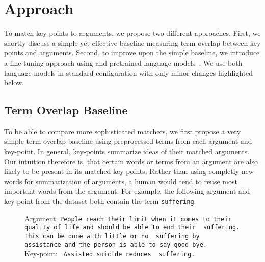 \section{Approach}\label{approach}

To match key points to arguments, we propose two different approaches.
First, we shortly discuss a simple yet effective baseline measuring term overlap between key points and arguments.
Second, to improve upon the simple baseline, we introduce a fine-tuning approach using \Bert and \Roberta pretrained language models~\cite{DevlinCLT2019,LiuOGDJCLLZS2019}. We use both language models in standard configuration with only minor changes highlighted below.

\subsection{Term Overlap Baseline}
To be able to compare more sophisticated matchers, we first propose a very simple term overlap baseline using preprocessed terms from each argument and key-point. 
In general, key-points summarize ideas of their matched arguments.
Our intuition therefore is, that certain words or terms from an argument are also likely to be present in its matched key-points.
Rather than using completly new words for summarization of arguments, a human would tend to reuse most important words from the argument.
For example, the following argument and key point from the \ArgKP dataset both contain the term \texttt{suffering}: \\

\begin{figure}[H]
    Argument: \texttt{People reach their limit when it comes to their quality of life and should be able to end their {\color{blue} suffering}. This can be done with little or no {\color{blue} suffering} by {\color{orange} assistance} and the person is able to say good bye.} \\
    Key-point: \texttt{{\color{orange} Assisted} suicide reduces {\color{blue} suffering}.}    
\end{figure}

